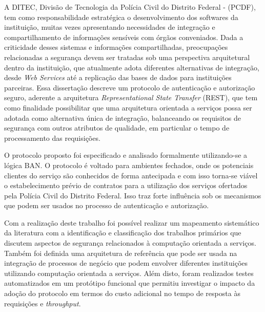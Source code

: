 \documentclass[mpca]{unb-cic}
\begin{document}
\begin{resumo}
 A DITEC, Divisão de Tecnologia da Polícia Civil do Distrito Federal - (PCDF), tem como responsabilidade estratégica o desenvolvimento dos softwares da instituição, muitas vezes apresentando necessidades de integração e compartilhamento de informações sensíveis com órgãos conveniados. Dada a criticidade desses sistemas e informações compartilhadas, preocupações relacionadas a segurança devem ser tratadas sob uma perspectiva arquitetural dentro da instituição, que atualmente adota diferentes alternativas de integração, desde \emph{Web Services} até a replicação das bases de dados para instituições parceiras. Essa dissertação descreve  um protocolo de autenticação e autorização seguro, aderente a arquitetura \emph{Representational State Transfer} (REST), que tem como finalidade possibilitar que uma arquitetura orientada a serviços possa ser adotada como alternativa única de integração, balanceando os requisitos de segurança com outros atributos de qualidade,  em particular o tempo de processamento das requisições.

 O protocolo proposto foi especificado e analisado formalmente utilizando-se a lógica BAN. O protocolo é voltado para ambientes fechados, onde os potenciais clientes do serviço são conhecidos de forma antecipada e com isso torna-se viável o estabelecimento prévio de contratos para a utilização dos serviços ofertados pela Polícia Civil do Distrito Federal. Isso traz forte influência sob os mecanismos que podem ser usados no processo de autenticação e autorização.

 Com a realização deste trabalho foi possível realizar um mapeamento sistemático da literatura com a identificação e classificação dos trabalhos primários que discutem aspectos de segurança relacionados à computação orientada a serviços. Também foi definida uma arquitetura de referência que pode ser usada na integração de processos de negócio que podem envolver diferentes instituições utilizando computação orientada a serviços. Além disto, foram realizados testes automatizados em um protótipo funcional que permitiu investigar o impacto da adoção do protocolo em termos do custo adicional no tempo de resposta às requisições e \emph{throughput}.

\end{resumo}
\end{document}
